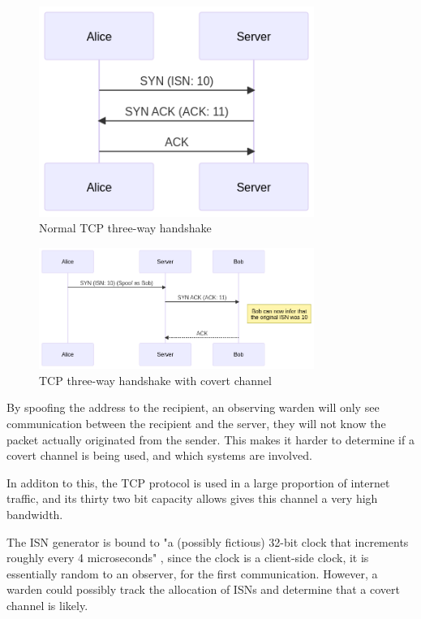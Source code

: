 \begin{figure}[H]
    \centering
    \includegraphics[width=0.8\textwidth]{fig/TCPACKNormal.png}
    \caption{Normal TCP three-way handshake}
    \label{fig:TCPACKNormal}
\end{figure}

\begin{figure}[H]
    \centering
    \includegraphics[width=0.8\textwidth]{fig/TCPACKCC.png}
    \caption{TCP three-way handshake with covert channel}
    \label{fig:TCPACKCC}
\end{figure}


By spoofing the address to the recipient, an observing warden will only see communication between the recipient and the server, they will not know the packet actually originated from the sender. This makes it harder to determine if a covert channel is being used, and which systems are involved.

In additon to this, the TCP protocol is used in a large proportion of internet traffic, and its thirty two bit capacity allows gives this channel a very high bandwidth.

The ISN generator is bound to "a (possibly fictious) 32-bit clock that increments roughly every 4 microseconds" \cite{Trfc793}, since the clock is a client-side clock, it is essentially random to an observer, for the first communication. However, a warden could possibly track the allocation of ISNs and determine that a covert channel is likely.

